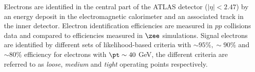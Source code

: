 Electrons are identified in the central part of the ATLAS detector
($|\eta| < 2.47$) by an energy deposit in the electromagnetic calorimeter and an
associated track in the inner detector. Electron identification efficiencies are
measured in $pp$ collisions data and compared to efficiencies measured in $\zee$
simulations. Signal electrons are identified by different sets of
likelihood-based criteria with $\sim 95\%, \sim 90\%$ and $\sim 80\%$ efficiency
for electrons with $\pt \sim 40~$GeV, the different criteria are referred to as
\emph{loose}, \emph{medium} and \emph{tight} operating points
respectively\cite{ATL-EL-IDENT}.
